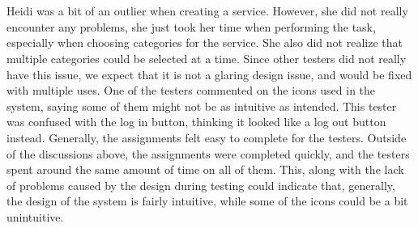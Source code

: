\\\\
Heidi was a bit of an outlier when creating a service.
However, she did not really encounter any problems, she just took her time when performing the task, especially when choosing categories for the service.
She also did not realize that multiple categories could be selected at a time.
Since other testers did not really have this issue, we expect that it is not a glaring design issue, and would be fixed with multiple uses.
One of the testers commented on the icons used in the system, saying some of them might not be as intuitive as intended.
This tester was confused with the log in button, thinking it looked like a log out button instead.
Generally, the assignments felt easy to complete for the testers.
Outside of the discussions above, the assignments were completed quickly, and the testers spent around the same amount of time on all of them.
This, along with the lack of problems caused by the design during testing could indicate that, generally, the design of the system is fairly intuitive, while some of the icons could be a bit unintuitive. 
